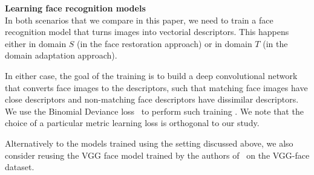 \bigskip
\indent\textbf{Learning face recognition models}\\
\label{sect:face_recognition}
In both scenarios that we compare in this paper, we need to train a face recognition model that turns images into vectorial descriptors. This happens either in domain $S$ (in the face restoration approach) or in domain $T$ (in the domain adaptation approach).

In either case, the goal of the training is to build a deep convolutional network that converts face images to the descriptors, such that matching face images have close descriptors and non-matching face descriptors have dissimilar descriptors. We use the Binomial Deviance loss~\citep{Yi14} to perform such training . We note that the choice of a particular metric learning loss is orthogonal to our study.

Alternatively to the models trained using the setting discussed above, we also consider reusing the VGG face model trained by the authors of~\citep{parkhi2015deep} on the VGG-face dataset.